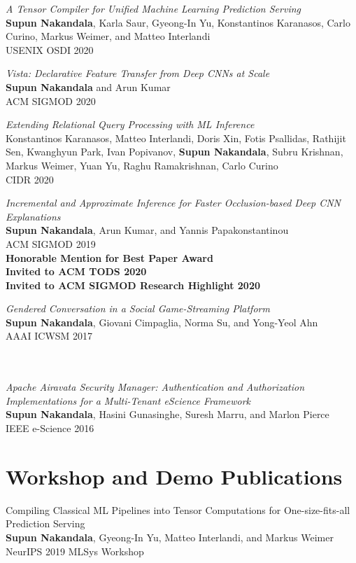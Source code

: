 \documentclass[margin]{res}
\begin{document}
\begin{resume}
\par
\textit{A Tensor Compiler for Unified Machine Learning Prediction Serving} \\
\textbf{Supun Nakandala}, Karla Saur, Gyeong-In Yu, Konstantinos Karanasos, Carlo Curino, Markus Weimer, and Matteo Interlandi\\
USENIX OSDI 2020

\par
\textit{Vista: Declarative Feature Transfer from Deep CNNs at Scale} \\
\textbf{Supun Nakandala} and Arun Kumar\\
ACM SIGMOD 2020


\par
\textit{Extending Relational Query Processing with ML Inference} \\
Konstantinos Karanasos, Matteo Interlandi, Doris Xin, Fotis Psallidas, Rathijit Sen, Kwanghyun Park, Ivan Popivanov, \textbf{Supun Nakandala}, Subru Krishnan, Markus Weimer, Yuan Yu, Raghu Ramakrishnan, Carlo Curino\\
CIDR 2020

\par
\textit{Incremental and Approximate Inference for Faster Occlusion-based Deep CNN Explanations} \\
\textbf{Supun Nakandala}, Arun Kumar, and Yannis Papakonstantinou \\
ACM SIGMOD 2019 \\
\textbf{Honorable Mention for Best Paper Award\\ Invited to ACM TODS 2020\\ Invited to ACM SIGMOD Research Highlight 2020}

\par
\textit{Gendered Conversation in a Social Game-Streaming Platform} \\
\textbf{Supun Nakandala}, Giovani Cimpaglia, Norma Su, and Yong-Yeol Ahn \\
AAAI ICWSM 2017\\\\\\

\par
\textit{Apache Airavata Security Manager: Authentication and Authorization Implementations for a Multi-Tenant eScience Framework
} \\
\textbf{Supun Nakandala}, Hasini Gunasinghe, Suresh Marru, and Marlon Pierce\\
IEEE e-Science 2016


\section{Workshop and Demo Publications}
\par
Compiling Classical ML Pipelines into Tensor Computations for One-size-fits-all Prediction Serving \\
\textbf{Supun Nakandala}, Gyeong-In Yu, Matteo Interlandi, and Markus Weimer\\
NeurIPS 2019 MLSys Workshop


\end{resume}
\end{document}
